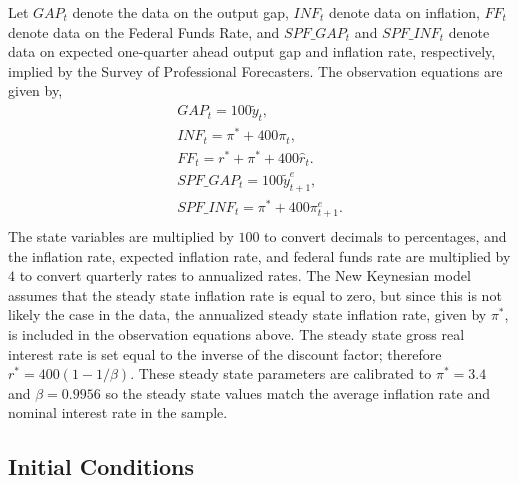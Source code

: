 \documentclass[12pt]{article}
\newcommand{\beq}{\begin{equation}}
\newcommand{\eeq}{\end{equation}}
\newcommand{\h}[1]{\hat{#1}}
\newcommand{\ds}{\displaystyle}
\begin{document}
Let $GAP_t$ denote the data on the output gap, $INF_t$ denote data on inflation, $FF_t$ denote data on the Federal Funds Rate, and $SPF\_GAP_t$ and $SPF\_INF_t$ denote data on expected one-quarter ahead output gap and inflation rate, respectively, implied by the Survey of Professional Forecasters.  The observation equations are given by,
\beq \begin{array}{l} \label{eq:obs}  
\ds GAP_t = 100 \tilde{y}_t, \\
\ds INF_t = \pi^{*} + 400\pi_t, \\
\ds FF_t = r^{*} + \pi^* + 400\h{r}_t.\\
\ds SPF\_GAP_t = 100 \tilde{y}_{t+1}^e, \\
\ds SPF\_INF_t = \pi^{*} + 400\pi_{t+1}^e. \\
\end{array}
\eeq
The state variables are multiplied by $100$ to convert decimals to percentages, and the inflation rate, expected inflation rate, and federal funds rate are multiplied by $4$ to convert quarterly rates to annualized rates.  The New Keynesian model assumes that the steady state inflation rate is equal to zero, but since this is not likely the case in the data, the annualized steady state inflation rate, given by  $\pi^*$, is included in the observation equations above.  The steady state gross real interest rate is set equal to the inverse of the discount factor; therefore $r^* = 400(1-1/\beta)$.  These steady state parameters are calibrated to $\pi^*=3.4$ and $\beta=0.9956$ so the steady state values match the average inflation rate and nominal interest rate in the sample.

\subsection{Initial Conditions}
\end{document}
